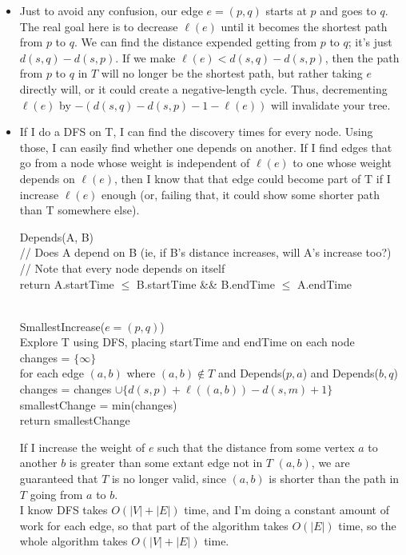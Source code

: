 \documentclass[11pt]{article}
\begin{document}
\begin{solution}
    \begin{itemize}
        \item Just to avoid any confusion, our edge $e = (p, q)$ starts at $p$ and goes to $q$. The real goal here is to decrease $\ell(e)$ until it becomes the shortest path from $p$ to $q$. We can find the distance expended getting from $p$ to $q$; it's just $d(s, q) - d(s, p)$. If we make $\ell(e) < d(s, q) - d(s, p)$, then the path from $p$ to $q$ in $T$ will no longer be the shortest path, but rather taking $e$ directly will, or it could create a negative-length cycle. Thus, decrementing $\ell(e)$ by $-(d(s, q) - d(s, p) - 1 - \ell(e))$ will invalidate your tree.
        \item If I do a DFS on T, I can find the discovery times for every node. Using those, I can easily find whether one depends on another. If I find edges that go from a node whose weight is independent of $\ell(e)$ to one whose weight depends on $\ell(e)$, then I know that that edge could become part of T if I increase $\ell(e)$ enough (or, failing that, it could show some shorter path than T somewhere else). 
            \begin{algo}
                Depends(A, B) \+
                \\ // Does A depend on B (ie, if B's distance increases, will A's increase too?)
                \\ // Note that every node depends on itself
                \\ return A.startTime $\leq$ B.startTime \&\& B.endTime $\leq$ A.endTime \-

                \\ SmallestIncrease($e = (p, q)$) \+
                \\ Explore T using DFS, placing startTime and endTime on each node 
                \\ changes = $\{\infty\}$
                \\ for each edge $(a, b)$ where $(a, b) \not \in T$ and Depends($p, a$) and Depends($b, q$) \+
                \\ changes = changes $\cup \{d(s, p) + \ell((a, b)) - d(s, m) + 1\}$ \-
                \\ smallestChange = min(changes)
                \\ return smallestChange
            \end{algo}
            If I increase the weight of $e$ such that the distance from some vertex $a$ to another $b$ is greater than some extant edge not in $T$ $(a, b)$, we are guaranteed that $T$ is no longer valid, since $(a, b)$ is shorter than the path in $T$ going from $a$ to $b$.
            \\ I know DFS takes $O(|V| + |E|)$ time, and I'm doing a constant amount of work for each edge, so that part of the algorithm takes $O(|E|)$ time, so the whole algorithm takes $O(|V|+|E|)$ time. 
    \end{itemize}
\end{solution}
\end{document}
